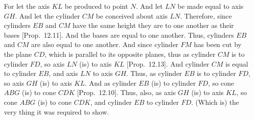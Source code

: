 \begin{Parallel}{}{}
{For let the axis $KL$ be produced to point $N$. And let $LN$ be made equal to axis $GH$. 
And let the cylinder $CM$ be conceived about axis $LN$. Therefore, since cylinders $EB$ and $CM$
have the same height they are to one another as their bases [Prop.~12.11]. And the bases are
equal to one another. Thus, cylinders $EB$ and $CM$ are also equal to one another. And since cylinder $FM$ has been cut
by the plane $CD$, which is parallel to its opposite planes, thus as cylinder $CM$ is to cylinder $FD$, so
axis $LN$ (is) to axis $KL$ [Prop.~12.13]. And cylinder $CM$ is equal to cylinder $EB$, and
axis $LN$ to axis $GH$.  Thus, as cylinder $EB$ is to cylinder $FD$, so axis $GH$ (is) to axis $KL$.  And as
cylinder $EB$ (is) to cylinder $FD$, so cone $ABG$ (is) to cone $CDK$ [Prop.~12.10].
Thus, also, as axis $GH$ (is) to axis $KL$, so cone $ABG$ (is) to cone $CDK$, and cylinder $EB$ to cylinder $FD$.
(Which is) the very thing it was required to show.}
\end{Parallel}

